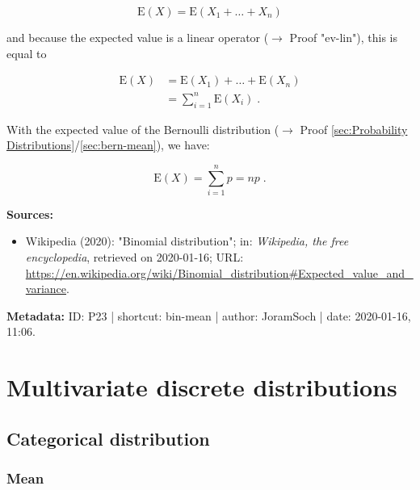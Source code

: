 \documentclass[a4paper,12pt]{book}
\begin{document}
\begin{equation} \label{eq:bin-mean-bin-mean-s1}
\mathrm{E}(X) = \mathrm{E}(X_1 + \ldots + X_n)
\end{equation}

and because the expected value is a linear operator ($\rightarrow$ Proof "ev-lin"), this is equal to

\begin{equation} \label{eq:bin-mean-bin-mean-s2}
\begin{split}
\mathrm{E}(X) &= \mathrm{E}(X_1) + \ldots + \mathrm{E}(X_n) \\
&= \sum_{i=1}^{n} \mathrm{E}(X_i) \; .
\end{split}
\end{equation}

With the expected value of the Bernoulli distribution ($\rightarrow$ Proof \ref{sec:Probability Distributions}/\ref{sec:bern-mean}), we have:

\begin{equation} \label{eq:bin-mean-bin-mean-s3}
\mathrm{E}(X) = \sum_{i=1}^{n} p = n p \; .
\end{equation}

\vspace{1em}
\textbf{Sources:}
\begin{itemize}
\item Wikipedia (2020): "Binomial distribution"; in: \textit{Wikipedia, the free encyclopedia}, retrieved on 2020-01-16; URL: \url{https://en.wikipedia.org/wiki/Binomial_distribution#Expected_value_and_variance}.
\end{itemize}


\vspace{1em}
\textbf{Metadata:} ID: P23 | shortcut: bin-mean | author: JoramSoch | date: 2020-01-16, 11:06.


\pagebreak
\section{Multivariate discrete distributions}

\subsection{Categorical distribution}

\subsubsection[\textbf{Mean}]{Mean} \label{sec:cat-mean}
\end{document}
